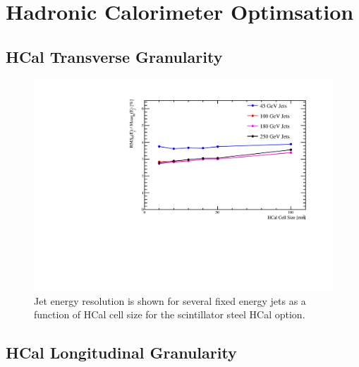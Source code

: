 \section{Hadronic Calorimeter Optimsation}
\label{optstud:sec:hcal}

\subsection{HCal Transverse Granularity}
\label{optstud:sec:hcal:cellsize}

\begin{figure}
  \includegraphics[width=\largefigwidth]{OptimisationStudies/Plots/JER_vs_HCalCellSize.pdf}
  \caption[Jet energy resolution as a function of HCal cell size for the scintillator steel HCal option.]{Jet energy resolution is shown for several fixed energy jets as a function of HCal cell size for the scintillator steel HCal option.}
  \label{optstud:fig:hcalcells}
\end{figure}

\subsection{HCal Longitudinal Granularity}
\label{optstud:sec:hcal:nlayers}

